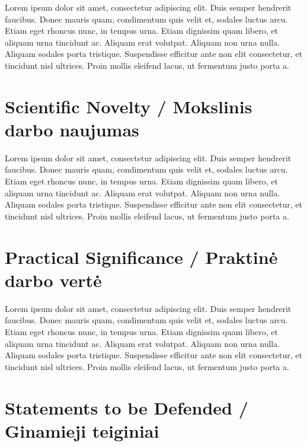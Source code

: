Lorem ipsum dolor sit amet, consectetur adipiscing elit. Duis semper hendrerit faucibus. Donec mauris quam, condimentum quis velit et, sodales luctus arcu. Etiam eget rhoncus nunc, in tempus urna. Etiam dignissim quam libero, et aliquam urna tincidunt ac. Aliquam erat volutpat. Aliquam non urna nulla. Aliquam sodales porta tristique. Suspendisse efficitur ante non elit consectetur, et tincidunt nisl ultrices. Proin mollis eleifend lacus, ut fermentum justo porta a.



\section*{Scientific Novelty / Mokslinis darbo naujumas} %

Lorem ipsum dolor sit amet, consectetur adipiscing elit. Duis semper hendrerit faucibus. Donec mauris quam, condimentum quis velit et, sodales luctus arcu. Etiam eget rhoncus nunc, in tempus urna. Etiam dignissim quam libero, et aliquam urna tincidunt ac. Aliquam erat volutpat. Aliquam non urna nulla. Aliquam sodales porta tristique. Suspendisse efficitur ante non elit consectetur, et tincidunt nisl ultrices. Proin mollis eleifend lacus, ut fermentum justo porta a.



\section*{Practical Significance / Praktinė darbo vertė}  %

Lorem ipsum dolor sit amet, consectetur adipiscing elit. Duis semper hendrerit faucibus. Donec mauris quam, condimentum quis velit et, sodales luctus arcu. Etiam eget rhoncus nunc, in tempus urna. Etiam dignissim quam libero, et aliquam urna tincidunt ac. Aliquam erat volutpat. Aliquam non urna nulla. Aliquam sodales porta tristique. Suspendisse efficitur ante non elit consectetur, et tincidunt nisl ultrices. Proin mollis eleifend lacus, ut fermentum justo porta a.


\section*{Statements to be Defended / Ginamieji teiginiai}

